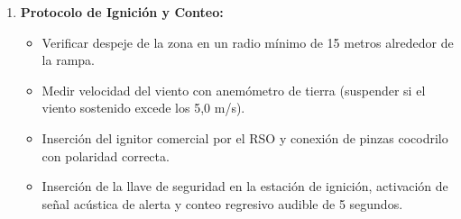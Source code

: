 \begin{enumerate}[leftmargin=1.5em]
    \item \textbf{Protocolo de Ignición y Conteo:}
    \begin{itemize}
        \item Verificar despeje de la zona en un radio mínimo de 15 metros alrededor de la rampa.
        \item Medir velocidad del viento con anemómetro de tierra (suspender si el viento sostenido excede los 5,0 m/s).
        \item Inserción del ignitor comercial por el RSO y conexión de pinzas cocodrilo con polaridad correcta.
        \item Inserción de la llave de seguridad en la estación de ignición, activación de señal acústica de alerta y conteo regresivo audible de 5 segundos.
    \end{itemize}
\end{enumerate}
